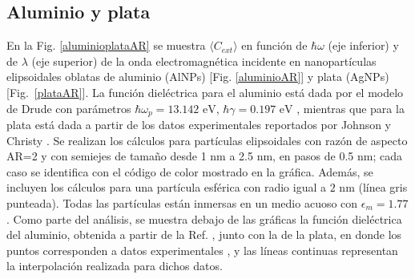 \subsection*{Aluminio y plata}
En la Fig. \ref{aluminioplataAR} se muestra $\langle C_{ext}\rangle$ en función de $\hbar\omega$ (eje inferior) y de  $\lambda$ (eje superior) de la onda electromagnética incidente en nanopartículas elipsoidales oblatas de aluminio (AlNPs) [Fig. \ref{aluminioAR}] y plata (AgNPs) [Fig.~\ref{plataAR}]. La función dieléctrica para el aluminio está dada por el modelo de Drude con parámetros $\hbar\omega_p=13.142\text{ eV}$, $\hbar\gamma=0.197\text{ eV}$ \cite{Aluminio}, mientras que para la plata  está dada a partir de los datos experimentales reportados por Johnson y Christy \cite{Plata}. Se realizan los cálculos para partículas elipsoidales con razón de aspecto AR=2 y con semiejes de tamaño desde 1 nm a 2.5 nm, en pasos de 0.5 nm; cada caso se identifica con el código de color mostrado en la gráfica. Además, se incluyen los cálculos para una partícula esférica con radio igual a $2 \text{ nm}$ (línea gris punteada). Todas las partículas están  inmersas en un medio acuoso con $\epsilon_m=1.77$. Como parte del análisis, se muestra debajo de las gráficas la función dieléctrica del aluminio, obtenida a partir de la Ref. \cite{Aluminio}, junto con la de la plata, en donde los puntos corresponden a datos experimentales \cite{Plata}, y las líneas continuas representan la interpolación realizada para dichos datos.
\\

